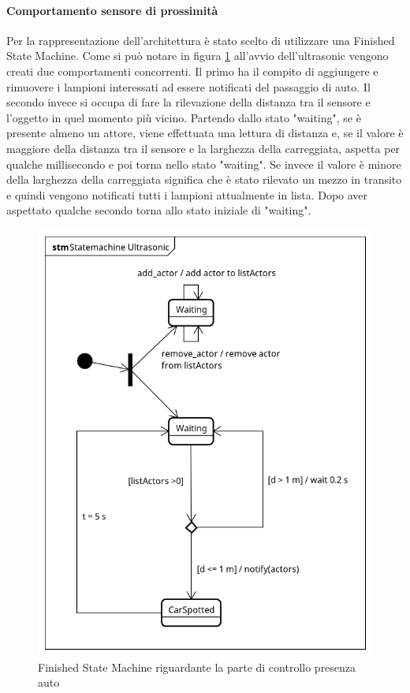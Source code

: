 \paragraph{Comportamento sensore di prossimità}
Per la rappresentazione dell'architettura è stato scelto di utilizzare una Finished State Machine.
Come si può notare in figura \ref{FSM CAR} all'avvio dell'ultrasonic vengono creati due comportamenti concorrenti.
Il primo ha il compito di aggiungere e rimuovere i lampioni interessati ad essere notificati del passaggio di auto.
Il secondo invece si occupa di fare la rilevazione della distanza tra il sensore e l'oggetto in quel momento più vicino.
Partendo dallo stato "waiting", se è presente almeno un attore, viene effettuata una lettura di distanza e, se il valore è maggiore della distanza tra il sensore e la larghezza della carreggiata, aspetta per qualche millisecondo e poi torna nello stato "waiting".
Se invece il valore è minore della larghezza della carreggiata significa che è stato rilevato un mezzo in transito e quindi vengono notificati tutti i lampioni attualmente in lista.
Dopo aver aspettato qualche secondo torna allo stato iniziale di "waiting".
\begin{figure}[tbp]
	\centering
	\includegraphics[scale=.75]{figure/Statemachine_Ultrasonic.png}
	\caption{Finished State Machine riguardante la parte di controllo presenza auto \label{FSM CAR}}
\end{figure}
